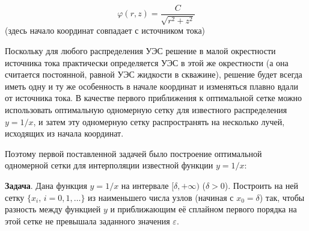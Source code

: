 $$\varphi(r, z)=\frac{C}{\sqrt{r^2+z^2}}$$ (здесь начало координат совпадает с источником тока)

Поскольку для любого распределения УЭС решение в малой окрестности источника тока практически определяется
УЭС в этой же окрестности (а она считается постоянной, равной УЭС жидкости в скважине), решение будет всегда
иметь одну и ту же особенность в начале координат и изменяться плавно вдали от источника тока.
В качестве первого приближения к оптимальной сетке можно использовать оптимальную одномерную сетку
для известного распределения $y=1/x$, и затем эту одномерную сетку распространять на несколько лучей,
исходящих из начала координат.

Поэтому первой поставленной задачей было построение оптимальной одномерной сетки для интерполяции
известной функции $y=1/x$:

{\bf Задача}. Дана функция $y=1/x$ на интервале $[\delta, +\infty)$ ($\delta > 0$). Построить на ней сетку
$\{x_i,\,i=0,1,\dots\}$ из наименьшего числа узлов (начиная с $x_0=\delta$) так, чтобы разность между
функцией $y$ и приближающим её сплайном первого порядка на этой сетке не превышала заданного значения
$\varepsilon$.

\def\ibreak{& \\ &}
\def\iline{& \\ \cline{1-2} &}

\makeatletter
\newenvironment{customenv}
  {\align &} %
  {& \endalign}

\newenvironment{systemed}
  {\left\{ \begin{aligned} &}
  {& \end{aligned} \right.}

\newenvironment{totalited}
  {\left[ \begin{aligned} &}
  {& \end{aligned} \right.}


